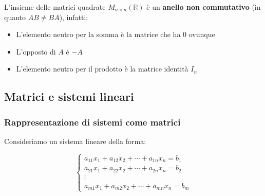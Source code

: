 \documentclass[
  a4paper,
]{article}
\providecommand{\tightlist}{%
  \setlength{\itemsep}{0pt}\setlength{\parskip}{0pt}}
\providecommand{\tightlist}{}
\begin{document}
\begin{observationbox}
L'insieme delle matrici quadrate \(M_{n \times n}(\mathbb{R})\) è un
\textbf{anello non commutativo} (in quanto \(AB \not = BA\)), infatti:

\begin{itemize}
\tightlist
\item
  L'elemento neutro per la somma è la matrice che ha \(0\) ovunque
\item
  L'opposto di \(A\) è \(-A\)
\item
  L'elemento neutro per il prodotto è la matrice identità \(I_n\)
\end{itemize}
\end{observationbox}

\hypertarget{matrici-e-sistemi-lineari}{%
\subsection{Matrici e sistemi lineari}\label{matrici-e-sistemi-lineari}}

\hypertarget{rappresentazione-di-sistemi-come-matrici}{%
\subsubsection{Rappresentazione di sistemi come
matrici}\label{rappresentazione-di-sistemi-come-matrici}}

Consideriamo un sistema lineare della forma:

\[
\begin{cases}
a_{11}x_1 + a_{12}x_2 + \cdots + a_{1n}x_n = b_1\\
a_{21}x_1 + a_{22}x_2 + \cdots + a_{2n}x_n = b_2\\
\vdots\\
a_{m1}x_1 + a_{m2}x_2 + \cdots + a_{mn}x_n = b_m
\end{cases}
\]
\end{document}
